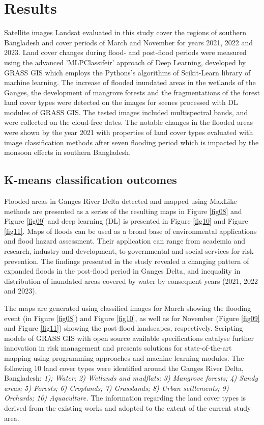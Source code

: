 \documentclass[water,article,submit,pdftex,moreauthors]{Definitions/mdpi}
\begin{document}
\section{Results}

Satellite images Landsat evaluated in this study cover the regions of southern Bangladesh and cover periods of March and November for years 2021, 2022 and 2023. Land cover changes during flood- and post-flood periods were measured using the advanced 'MLPClassifeir' approach of Deep Learning, developed by GRASS GIS which employs the Pythons's algorithms of Scikit-Learn library of machine learning. The increase of flooded inundated areas in the wetlands of the Ganges, the development of mangrove forests and the fragmentations of the forest land cover types were detected on the images for scenes processed with DL modules of GRASS GIS. The tested images included multispectral bands, and were collected on the cloud-free dates. The notable changes in the flooded areas were shown by the year 2021 with properties of land cover types evaluated with image classification methods after seven flooding period which is impacted by the monsoon effects in southern Bangladesh.

\subsection{K-means classification outcomes}

Flooded areas in Ganges River Delta detected and mapped using MaxLike methods are presented as a series of the resulting maps in Figure \ref{fig08} and Figure \ref{fig09} and deep learning (DL) is presented in Figure \ref{fig10} and Figure \ref{fig11}. Maps of floods can be used as a broad base of environmental applications and flood hazard assessment. Their application can range from academia and research, industry and development, to governmental and social services for risk prevention. The findings presented in the study revealed a changing pattern of expanded floods in the post-flood period in Ganges Delta, and inequality in distribution of inundated areas covered by water by consequent years (2021, 2022 and 2023). 

The maps are generated using classified images for March showing the flooding event (in Figure \ref{fig08}) and Figure \ref{fig10}, as well as for November (Figure \ref{fig09} and Figure \ref{fig11}) showing the post-flood landscapes, respectively. Scripting models of GRASS GIS with open source available specifications catalyse further innovation in risk management and presents solutions for state-of-the-art mapping using programming approaches and machine learning modules. The following 10 land cover types were identified around the Ganges River Delta, Bangladesh: \emph{1); Water; 2) Wetlands and mudflats; 3) Mangrove forests; 4) Sandy areas; 5) Forests; 6) Croplands; 7) Grasslands; 8) Urban settlements; 9) Orchards; 10) Aquaculture.} The information regarding the land cover types is derived from the existing works \cite{Rahman2020,rs13234799,Paszkowski2021} and adopted to the extent of the current study area.
\end{document}
